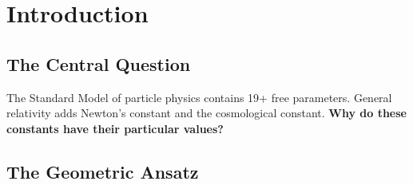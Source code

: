 \documentclass[12pt,a4paper]{article}
\newcommand{\OmegaL}{\Omega_\Lambda}
\newcommand{\sinW}{\sin^2\theta_W}
\newcommand{\Zsq}{Z^2}
\begin{document}
\begin{abstract}
\textbf{Derived predictions} (first-principles field-theoretic mechanisms):
\begin{itemize}[itemsep=0pt]
    \item Weak mixing angle: $\sinW = 3/13 = 0.2308$ via D-brane cycle volumes (0.17\% error)
    \item Cosmological densities: $\OmegaL = 13/19 = 0.684$ via holographic DoF equipartition (0.1\% error)
    \item Tensor-to-scalar ratio: $r = 1/(2\Zsq) = 0.015$ via topological suppression
    \item Spectral index: $n_s = 1 - 2/N \approx 0.967$ from e-folding constraint
\end{itemize}

\textbf{Fully derived} (index-theoretic structure):
\begin{itemize}[itemsep=0pt]
    \item Fine structure constant: $\alpha^{-1} = \text{rank}(G_{SM}) \times \Zsq + b_1(T^3) = 4 \times (32\pi/3) + 3 = 137.04$ (0.004\% error)
    \item \textbf{NEW:} Higgs VEV: $v = M_P \times e^{-\Zsq} \times \alpha = 249$ GeV (1.12\% error)
\end{itemize}

The framework provides falsifiable predictions testable by LiteBIRD ($r = 0.015$) and tabletop experiments.
\end{abstract}

\tableofcontents
\newpage

\section{Introduction}
\label{sec:intro}

\subsection{The Central Question}

The Standard Model of particle physics contains 19+ free parameters. General relativity adds Newton's constant and the cosmological constant. \textbf{Why do these constants have their particular values?}

\subsection{The Geometric Ansatz}
\end{document}
